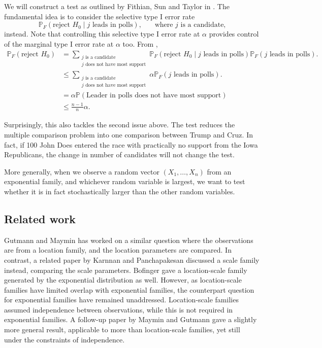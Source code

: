 \documentclass[11pt]{article}
\newcommand{\PP}{\mathbb{P}}
\begin{document}
We will construct a test as outlined by Fithian, Sun and Taylor in \cite{Fithian:2014ws}. The fundamental idea is to consider the selective type I error rate
$$\PP_F\left(\text{reject } H_0 \middle| j \text{ leads in polls} \right), ~~~~~~~~ \text{where $j$ is a candidate,}$$
instead. Note that controlling this selective type I error rate at $\alpha$ provides control of the marginal type I error rate at $\alpha$ too. From ,
\begin{align}
\PP_F\left(\text{reject } H_0\right) & = \sum_{\substack{j \text{ is a candidate} \\ j \text{ does not have most support}}} \PP_F\left(\text{reject } H_0 \middle| j \text{ leads in polls}\right) \PP_F \left(j \text{ leads in polls}\right). \nonumber \\
& \le \sum_{\substack{j \text{ is a candidate} \\ j \text{ does not have most support}}} \alpha \PP_F \left(j \text{ leads in polls}\right). \nonumber \\
& = \alpha \PP\left(\text{Leader in polls does not have most support}\right) \nonumber \\
& \le \frac{n-1}{n} \alpha. \label{eqn:selective_vs_marginal}
\end{align}

Surprisingly, this also tackles the second issue above. The test reduces the multiple comparison problem into one comparison between Trump and Cruz. In fact, if 100 John Does entered the race with practically no support from the Iowa Republicans, the change in number of candidates will not change the test.

More generally, when we observe a random vector $(X_1, \ldots, X_n)$ from an exponential family, and whichever random variable is largest, we want to test whether it is in fact stochastically larger than the other random variables.

\subsection{Related work}

Gutmann and Maymin \cite{Gutmann:1987fk} has worked on a similar question where the observations are from a location family, and the location parameters are compared. In contrast, a related paper by Karnnan and Panchapakesan \cite{Karnnan:2009iv} discussed a scale family instead, comparing the scale parameters. Bofinger \cite{Bofinger:1991hv} gave a location-scale family generated by the exponential distribution as well. However, as location-scale families have limited overlap with exponential families, the counterpart question for exponential families have remained unaddressed. Location-scale families assumed independence between observations, while this is not required in exponential families. A follow-up paper by Maymin and Gutmann \cite{Maymin:1992fz} gave a slightly more general result, applicable to more than location-scale families, yet still under the constraints of independence.
\end{document}
